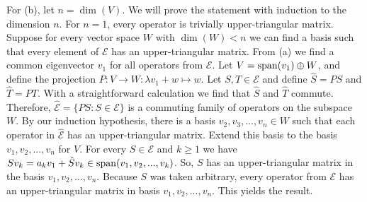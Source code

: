 For (b), let $n = \dim(V)$.
We will prove the statement with induction to the dimension $n$.
For $n = 1$, every operator is trivially upper-triangular matrix.
Suppose for every vector space $W$ with $\dim(W) < n$ we can find a basis such that every element of $\mathcal{E}$ has an upper-triangular matrix.
From (a) we find a common eigenvector $v_1$ for all operators from $\mathcal{E}$.
Let $V = \mathrm{span}(v_1) \oplus W$, and define the projection $P: V \to W: \lambda v_1 + w \mapsto w$.
Let $S, T \in \mathcal{E}$ and define $\hat{S} = PS$ and $\hat{T} = PT$.
With a straightforward calculation we find that $\hat{S}$ and $\hat{T}$ commute.
Therefore, $\hat{\mathcal{E}} = \{ PS : S \in \mathcal{E} \}$ is a commuting family of operators on the subspace $W$.
By our induction hypothesis, there is a basis $v_2, v_3, ..., v_n \in W$ such that each operator in $\hat{\mathcal{E}}$ has an upper-triangular matrix.
Extend this basis to the basis $v_1, v_2, ..., v_n$ for $V$.
For every $S \in \mathcal{E}$ and $k \geq 1$ we have $Sv_k = a_k v_1 + \hat{S}v_k \in \mathrm{span}(v_1, v_2, ..., v_k)$.
So, $S$ has an upper-triangular matrix in the basis $v_1, v_2, ..., v_n$.
Because $S$ was taken arbitrary, every operator from $\mathcal{E}$ has an upper-triangular matrix in basis $v_1, v_2, ..., v_n$.
This yields the result.
